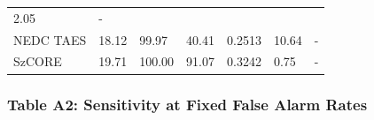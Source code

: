 \documentclass[
  10pt,
]{article}
\begin{document}
\begin{longtable}[]{@{}lllllll@{}}
\begin{minipage}[t]{0.12\columnwidth}
2.05\strut
\end{minipage} & \begin{minipage}[t]{0.12\columnwidth}\raggedright
-\strut
\end{minipage}\tabularnewline
\begin{minipage}[t]{0.12\columnwidth}\raggedright
NEDC TAES\strut
\end{minipage} & \begin{minipage}[t]{0.12\columnwidth}\raggedright
18.12\strut
\end{minipage} & \begin{minipage}[t]{0.12\columnwidth}\raggedright
99.97\strut
\end{minipage} & \begin{minipage}[t]{0.12\columnwidth}\raggedright
40.41\strut
\end{minipage} & \begin{minipage}[t]{0.12\columnwidth}\raggedright
0.2513\strut
\end{minipage} & \begin{minipage}[t]{0.12\columnwidth}\raggedright
10.64\strut
\end{minipage} & \begin{minipage}[t]{0.12\columnwidth}\raggedright
-\strut
\end{minipage}\tabularnewline
\begin{minipage}[t]{0.12\columnwidth}\raggedright
SzCORE\strut
\end{minipage} & \begin{minipage}[t]{0.12\columnwidth}\raggedright
19.71\strut
\end{minipage} & \begin{minipage}[t]{0.12\columnwidth}\raggedright
100.00\strut
\end{minipage} & \begin{minipage}[t]{0.12\columnwidth}\raggedright
91.07\strut
\end{minipage} & \begin{minipage}[t]{0.12\columnwidth}\raggedright
0.3242\strut
\end{minipage} & \begin{minipage}[t]{0.12\columnwidth}\raggedright
0.75\strut
\end{minipage} & \begin{minipage}[t]{0.12\columnwidth}\raggedright
-\strut
\end{minipage}\tabularnewline
\bottomrule
\end{longtable}

\hypertarget{table-a2-sensitivity-at-fixed-false-alarm-rates}{%
\subsubsection{Table A2: Sensitivity at Fixed False Alarm
Rates}\label{table-a2-sensitivity-at-fixed-false-alarm-rates}}
\end{document}
